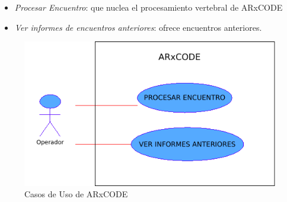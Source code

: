  
\begin{itemize}
 \item {\it{Procesar Encuentro}}: que nuclea el procesamiento vertebral de ARxCODE
 \item {\it{Ver informes de encuentros anteriores}}: ofrece encuentros anteriores.
\end{itemize}

\begin{figure}[h]
  \centering
  \includegraphics[width=.5\textwidth]{imagenes/usecaseAR}
  \caption{Casos de Uso de ARxCODE}
  \label{fig:casosuso}
\end{figure}


